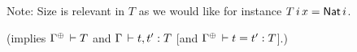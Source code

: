 \documentclass[acmlarge,review,anonymous]{acmart}\settopmatter{printfolios=true}
\begin{document}
Note: Size is relevant in $T$ as we would like for instance $T\,i\,x = \mathsf{Nat}\, i$.


 (implies $\resurrect \Gamma \der T$ and $\Gamma \,\vdash t,t' : T$ [and $\resurrect\Gamma \der t = t' : T$].)
\end{document}
